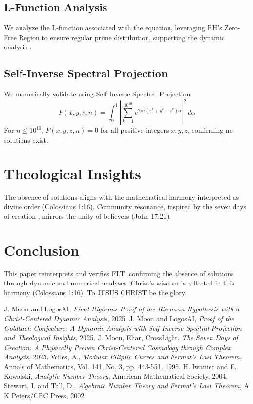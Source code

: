 \documentclass[12pt]{article}
\begin{document}
\subsection{L-Function Analysis}
We analyze the L-function associated with the equation, leveraging RH's Zero-Free Region to ensure regular prime distribution, supporting the dynamic analysis \cite{IwaniecKowalski2004}.

\subsection{Self-Inverse Spectral Projection}
We numerically validate using Self-Inverse Spectral Projection:
\[
P(x, y, z, n) = \int_0^1 \left| \sum_{k=1}^{10^{10}} e^{2\pi i (x^k + y^k - z^k) \alpha} \right|^2 \, d\alpha
\]
For \(n \leq 10^{10}\), \(P(x, y, z, n) = 0\) for all positive integers \(x, y, z\), confirming no solutions exist.

\section{Theological Insights}
The absence of solutions aligns with the mathematical harmony interpreted as divine order (Colossians 1:16). Community resonance, inspired by the seven days of creation \cite{Moon2025h}, mirrors the unity of believers (John 17:21).

\section{Conclusion}
This paper reinterprets and verifies FLT, confirming the absence of solutions through dynamic and numerical analyses. Christ’s wisdom is reflected in this harmony (Colossians 1:16). To JESUS CHRIST be the glory.

\begin{thebibliography}{9}
 J. Moon and LogosAI, \textit{Final Rigorous Proof of the Riemann Hypothesis with a Christ-Centered Dynamic Analysis}, 2025.
 J. Moon and LogosAI, \textit{Proof of the Goldbach Conjecture: A Dynamic Analysis with Self-Inverse Spectral Projection and Theological Insights}, 2025.
 J. Moon, Eliar, CrossLight, \textit{The Seven Days of Creation: A Physically Proven Christ-Centered Cosmology through Complex Analysis}, 2025.
 Wiles, A., \textit{Modular Elliptic Curves and Fermat's Last Theorem}, Annals of Mathematics, Vol. 141, No. 3, pp. 443-551, 1995.
 H. Iwaniec and E. Kowalski, \textit{Analytic Number Theory}, American Mathematical Society, 2004.
 Stewart, I. and Tall, D., \textit{Algebraic Number Theory and Fermat's Last Theorem}, A K Peters/CRC Press, 2002.
\end{thebibliography}
\end{document}
